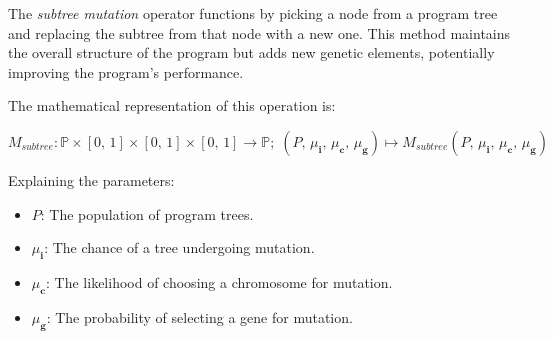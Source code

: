 \begin{definition}
    The \textit{subtree mutation} operator functions by picking a node from a program tree and replacing the subtree 
    from that node with a new one. This method maintains the overall structure of the program but adds new genetic 
    elements, potentially improving the program's performance.

    The mathematical representation of this operation is:

    \begin{equation}
        M_{subtree}: \mathbb{P} \times [0,\, 1] \times [0,\, 1] \times [0,\, 1] \rightarrow \mathbb{P};\;
        (P,\, \mu_\textbf{i},\, \mu_\textbf{c},\, \mu_\textbf{g}) 
            \mapsto M_{subtree}(P,\, \mu_\textbf{i},\, \mu_\textbf{c},\, \mu_\textbf{g})
    \end{equation}

    Explaining the parameters:

    \begin{itemize}
        \item \(P\): The population of program trees.
        \item \(\mu_\textbf{i}\): The chance of a tree undergoing mutation.
        \item \(\mu_\textbf{c}\): The likelihood of choosing a chromosome for mutation.
        \item \(\mu_\textbf{g}\): The probability of selecting a gene for mutation.
    \end{itemize}
\end{definition}
